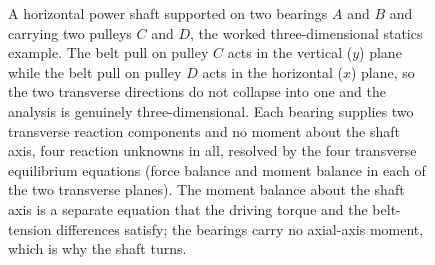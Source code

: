\begin{figure}[htbp]
\caption[Shaft on two bearings carrying two pulleys]{A horizontal power
shaft supported on two bearings $A$ and $B$ and carrying two pulleys $C$
and $D$, the worked three-dimensional statics example. The belt pull on
pulley $C$ acts in the vertical ($y$) plane while the belt pull on pulley
$D$ acts in the horizontal ($x$) plane, so the two transverse directions do
not collapse into one and the analysis is genuinely three-dimensional. Each
bearing supplies two transverse reaction components and no moment about the
shaft axis, four reaction unknowns in all, resolved by the four transverse
equilibrium equations (force balance and moment balance in each of the two
transverse planes). The moment balance about the shaft axis is a separate
equation that the driving torque and the belt-tension differences satisfy;
the bearings carry no axial-axis moment, which is why the shaft turns.}
\label{fig:vol03ch02:shaft-bearings}
\end{figure}
